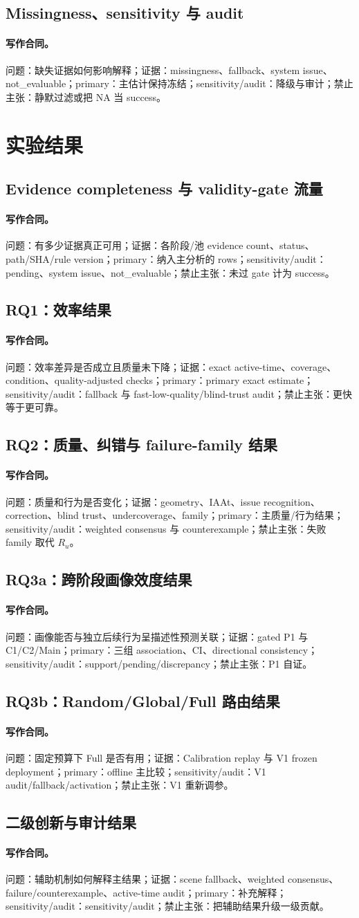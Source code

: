 \documentclass[UTF8,a4paper,12pt]{ctexart}
\newcommand{\contract}[5]{\paragraph{写作合同。}问题：#1；证据：#2；primary：#3；sensitivity/audit：#4；禁止主张：#5。}
\begin{document}
\subsection{Missingness、sensitivity 与 audit}
\contract{缺失证据如何影响解释}{missingness、fallback、system issue、not\_evaluable}{主估计保持冻结}{降级与审计}{静默过滤或把 NA 当 success}

\section{实验结果}
\subsection{Evidence completeness 与 validity-gate 流量}
\contract{有多少证据真正可用}{各阶段/池 evidence count、status、path/SHA/rule version}{纳入主分析的 rows}{pending、system issue、not\_evaluable}{未过 gate 计为 success}
\subsection{RQ1：效率结果}
\contract{效率差异是否成立且质量未下降}{exact active-time、coverage、condition、quality-adjusted checks}{primary exact estimate}{fallback 与 fast-low-quality/blind-trust audit}{更快等于更可靠}
\subsection{RQ2：质量、纠错与 failure-family 结果}
\contract{质量和行为是否变化}{geometry、IAAt、issue recognition、correction、blind trust、undercoverage、family}{主质量/行为结果}{weighted consensus 与 counterexample}{失败 family 取代 $R_u$}
\subsection{RQ3a：跨阶段画像效度结果}
\contract{画像能否与独立后续行为呈描述性预测关联}{gated P1 与 C1/C2/Main}{三组 association、CI、directional consistency}{support/pending/discrepancy}{P1 自证}
\subsection{RQ3b：Random/Global/Full 路由结果}
\contract{固定预算下 Full 是否有用}{Calibration replay 与 V1 frozen deployment}{offline 主比较}{V1 audit/fallback/activation}{V1 重新调参}
\subsection{二级创新与审计结果}
\contract{辅助机制如何解释主结果}{scene fallback、weighted consensus、failure/counterexample、active-time audit}{补充解释}{sensitivity/audit}{把辅助结果升级一级贡献}
\end{document}
